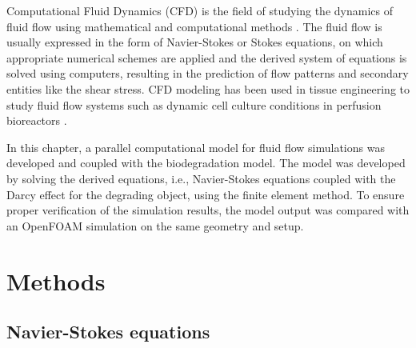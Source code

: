 Computational Fluid Dynamics (\gls{CFD}) is the field of studying the dynamics of fluid flow using mathematical and computational methods \cite{H.Versteeg2007,Sharma2022}. The fluid flow is usually expressed in the form of Navier-Stokes or Stokes equations, on which appropriate numerical schemes are applied and the derived system of equations is solved using computers, resulting in the prediction of flow patterns and secondary entities like the shear stress. \gls{CFD} modeling has been used in tissue engineering to study fluid flow systems such as dynamic cell culture conditions in perfusion bioreactors \cite{Hutmacher2008, Hossain2012,Patrachari2012}.

In this chapter, a parallel computational model for fluid flow simulations was developed and coupled with the biodegradation model. The model was developed by solving the derived equations, i.e., Navier-Stokes equations coupled with the Darcy effect for the degrading object, using the finite element method. To ensure proper verification of the simulation results, the model output was compared with an OpenFOAM simulation on the same geometry and setup.

\section{Methods}

\subsection{Navier-Stokes equations}

